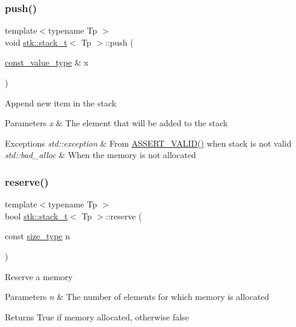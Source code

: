 \subsubsection{\texorpdfstring{push()}{push()}}
{\footnotesize\ttfamily template$<$typename Tp $>$ \\
void \hyperlink{classstk_1_1stack__t}{stk\+::stack\+\_\+t}$<$ Tp $>$\+::push (\begin{DoxyParamCaption}\item[{\hyperlink{classstk_1_1stack__t_a0beb74f603c2354cb9af98ee65801ce7}{const\+\_\+value\+\_\+type} \&}]{x }\end{DoxyParamCaption})}

Append new item in the stack 
\begin{DoxyParams}{Parameters}
{\em x} & The element that will be added to the stack \\
\hline
\end{DoxyParams}

\begin{DoxyExceptions}{Exceptions}
{\em std\+::exception} & From \hyperlink{stack_8h_a4ad7af85cae2910ffcf6bfbcb8278886}{A\+S\+S\+E\+R\+T\+\_\+\+V\+A\+L\+I\+D()} when stack is not valid \\
\hline
{\em std\+::bad\+\_\+alloc} & When the memory is not allocated \\
\hline
\end{DoxyExceptions}
\mbox{\label{classstk_1_1stack__t_a4bbfc186d4b0eab296b620b72d8f872d}} 
\subsubsection{\texorpdfstring{reserve()}{reserve()}}
{\footnotesize\ttfamily template$<$typename Tp $>$ \\
bool \hyperlink{classstk_1_1stack__t}{stk\+::stack\+\_\+t}$<$ Tp $>$\+::reserve (\begin{DoxyParamCaption}\item[{const \hyperlink{classstk_1_1stack__t_a591d5ffc540c9f27e5618f9aa4d67cad}{size\+\_\+type}}]{n }\end{DoxyParamCaption})}

Reserve a memory 
\begin{DoxyParams}{Parameters}
{\em n} & The number of elements for which memory is allocated \\
\hline
\end{DoxyParams}
\begin{DoxyReturn}{Returns}
True if memory allocated, otherwise false 
\end{DoxyReturn}
\mbox{\label{classstk_1_1stack__t_a3770048637478cc005d11a47ee4df148}} 
